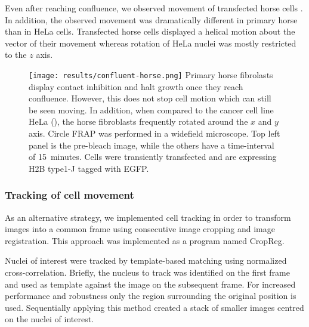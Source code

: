       Even after reaching confluence, we observed movement of transfected horse cells .
      In addition, the observed movement was dramatically different in primary horse than in HeLa cells.
      Transfected horse cells displayed a helical motion about the vector of their movement
      whereas rotation of HeLa nuclei was mostly restricted to the $z$ axis.

      \begin{figure}
        \centering
        \texttt{[image: results/confluent-horse.png]}
          {
            Primary horse fibrolasts display contact inhibition and halt growth
            once they reach confluence. However, this does not stop cell
            motion which can still be seen moving. In addition, when compared
            to the cancer cell line HeLa (),
            the horse fibroblasts frequently rotated around the $x$ and $y$
            axis. Circle FRAP was performed in a widefield microscope.
            Top left panel is the pre-bleach image, while the others have a
            time-interval of 15~minutes. Cells were transiently transfected
            and are expressing H2B type1-J tagged with EGFP.
          }
        \label{fig:kill-frap:confluent-horse}
      \end{figure}

    \subsubsection{Tracking of cell movement}

      As an alternative strategy, we implemented cell tracking
      in order to transform images into a common frame using
      consecutive image cropping and image registration.
      This approach was implemented as a program named CropReg.

      Nuclei of interest were tracked by template-based matching using normalized cross-correlation.
      Briefly, the nucleus to track was identified on the first frame and
      used as template against the image on the subsequent frame.
      For increased performance and robustness only the region surrounding the original position is used.
      Sequentially applying this method created a stack of smaller images centred on the nuclei of interest.

